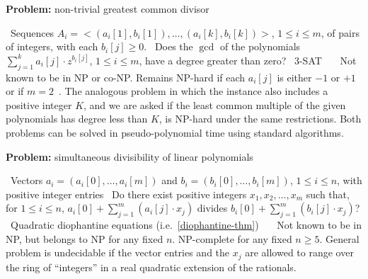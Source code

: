 \documentclass{amsart}
\theoremstyle{plain}
\begin{document}
\begin{algorithm}[h]
  \caption*{\textbf{Problem:} non-trivial greatest common divisor}
  \begin{algorithmic}[1]
    \Require\, Sequences $A_i=<(a_i[1],b_i[1]),\ldots,(a_i[k],b_i[k])>$, $1\leq i\leq m$, of pairs
    of integers, with each $b_i[j]\geq 0$.
    \Description\, Does the $\gcd$ of the polynomials $\sum_{j=1}^k a_i[j]\cdot z^{b_i[j]}$, $1\leq
    i\leq m$, have a degree greater than zero?
    \Reduction\, 3-SAT
    \Reference\,~\cite{plaisted-77a}
    \Commentx\, Not known to be in NP or co-NP\@. Remains NP-hard if each $a_i[j]$ is either $-1$
    or $+1$~\cite{plaisted-76} or if $m=2$~\cite{plaisted-77b}. The analogous problem in which the
    instance also includes a positive integer $K$, and we are asked if the least common multiple of
    the given polynomials has degree less than $K$, is NP-hard under the same restrictions. Both
    problems can be solved in pseudo-polynomial time using standard algorithms.
  \end{algorithmic}
\end{algorithm}
\newpage

\begin{algorithm}[h]
  \caption*{\textbf{Problem:} simultaneous divisibility of linear polynomials}
  \begin{algorithmic}[1]
    \Require\, Vectors $a_i=(a_i[0],\ldots,a_i[m])$ and $b_i=(b_i[0],\ldots,b_i[m])$, $1\leq i\leq
    n$, with positive integer entries
    \Description\, Do there exist positive integers $x_1,x_2,\ldots,x_m$ such that, for $1\leq
    i\leq n$, $a_i[0]+\sum_{j=1}^m(a_i[j]\cdot x_j)$ divides $b_i[0]+\sum_{j=1}^m(b_i[j]\cdot
    x_j)$?
    \Reduction\, Quadratic diophantine equations (i.e.\ \autoref{diophantine-thm})
    \Reference\,~\cite{lipshitz-77,lipshitz-78}
    \Commentx\, Not known to be in NP, but belongs to NP for any fixed $n$. NP-complete for any
    fixed $n\geq 5$. General problem is undecidable if the vector entries and the $x_j$ are allowed
    to range over the ring of ``integers'' in a real quadratic extension of the rationals.
  \end{algorithmic}
\end{algorithm}

\newpage

\printbibliography[]
\end{document}
